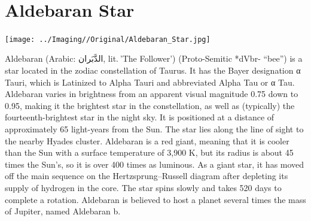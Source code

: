 \newpage\pagecolor{black}\color{white}
\ \\\section{Aldebaran Star}
\texttt{[image: ../Imaging//Original/Aldebaran\_Star.jpg]}
{\footnotesize\color{white}
Aldebaran (Arabic: الدَّبَران, lit. 'The Follower') (Proto-Semitic *dVbr- “bee”) is a star located in the zodiac constellation of Taurus. It has the Bayer designation α Tauri, which is Latinized to Alpha Tauri and abbreviated Alpha Tau or α Tau. Aldebaran varies in brightness from an apparent visual magnitude 0.75 down to 0.95, making it the brightest star in the constellation, as well as (typically) the fourteenth-brightest star in the night sky. It is positioned at a distance of approximately 65 light-years from the Sun. The star lies along the line of sight to the nearby Hyades cluster. Aldebaran is a red giant, meaning that it is cooler than the Sun with a surface temperature of 3,900 K, but its radius is about 45 times the Sun's, so it is over 400 times as luminous. As a giant star, it has moved off the main sequence on the Hertzsprung–Russell diagram after depleting its supply of hydrogen in the core. The star spins slowly and takes 520 days to complete a rotation. Aldebaran is believed to host a planet several times the mass of Jupiter, named Aldebaran b.


}\ \\
